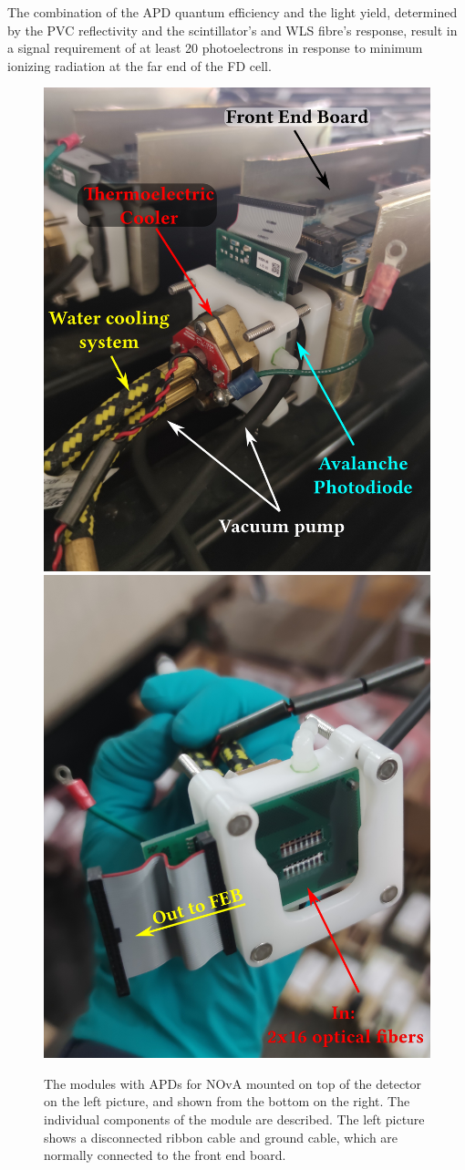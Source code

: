 The combination of the \gls{APD} quantum efficiency and the light yield, determined by the \gls{PVC} reflectivity and the scintillator's and \gls{WLS} fibre's response, result in a signal requirement of at least 20 photoelectrons in response to minimum ionizing radiation at the far end of the \gls{FD} cell.



\begin{figure}[!htb]  
  \centering
  \includegraphics*[width=.495\textwidth]{Plots/NOvAExperiment/NOvAAPDMountedWithLabels.jpg}
  \noindent\centering
  \includegraphics*[width=.495\textwidth]{Plots/NOvAExperiment/NOvAAPDBottomWithLabels.jpg}
  \caption[NOvA Avalanche Photo Diods]{The modules with \acrshort{APD}s for \acrshort{NOvA} mounted on top of the detector on the left picture, and shown from the bottom on the right. The individual components of the module are described. The left picture shows a disconnected ribbon cable and ground cable, which are normally connected to the front end board.}
 \label{fig:NOvAAPD}
\end{figure}

